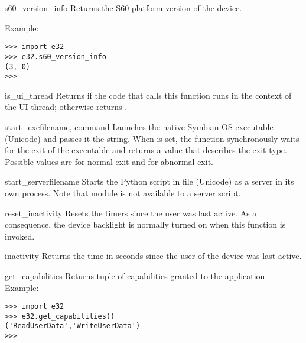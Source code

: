 \begin{datadesc}{s60_version_info}
Returns the S60 platform version of the device.

Example:
\begin{verbatim}
>>> import e32
>>> e32.s60_version_info
(3, 0)
>>>
\end{verbatim}
\end{datadesc}

\begin{funcdesc}{is_ui_thread}{}
Returns  if the code that calls this function runs in the 
context of the UI thread; otherwise returns .
\end{funcdesc}

\begin{funcdesc}{start_exe}{filename, command }
Launches the native Symbian OS executable  
(Unicode) and passes it the  string. When 
 is set, the function synchronously waits for the exit 
of the executable and returns a value that describes the exit type. Possible 
values are  for normal exit and  for abnormal exit.
\end{funcdesc}

\begin{funcdesc}{start_server}{filename}
Starts the Python script in file  (Unicode) as a 
server in its own process. Note that  module is not 
available to a server script.
\end{funcdesc}

\begin{funcdesc}{reset_inactivity}{}
Resets the timers since the user was last active. As a consequence, the device 
backlight is normally turned on when this function is invoked.
\end{funcdesc}

\begin{funcdesc}{inactivity}{}
Returns the time in seconds since the user of the device was last active.
\end{funcdesc}

\begin{funcdesc}{get_capabilities}{}
Returns tuple of capabilities granted to the application.
Example:

\begin{verbatim}
>>> import e32
>>> e32.get_capabilities()
('ReadUserData','WriteUserData')
>>>
\end{verbatim}
\end{funcdesc}

